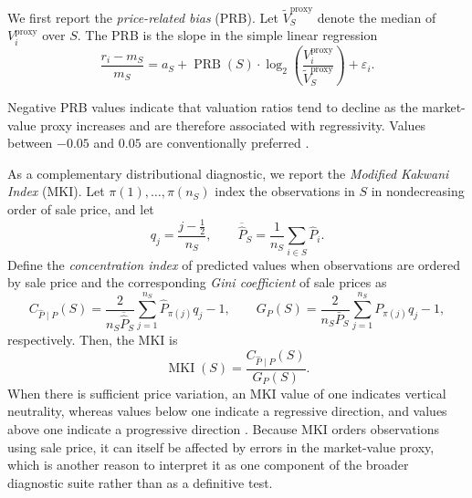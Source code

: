 \documentclass[10pt]{article}
\theoremstyle{definition}
\newcommand{\1}{\mathbf{1}}
\begin{document}
{We first report the \textit{price-related bias} (PRB).}
Let $\widetilde V_S^{\mathrm{proxy}}$ denote the median of $V_i^{\mathrm{proxy}}$ over $S$. The PRB is the slope in the simple linear regression
\begin{equation}
\label{eq:prb}
\frac{r_i-m_S}{m_S}
=
a_S
+
\operatorname{PRB}(S)\cdot
\log_2\left(
\frac{V_i^{\mathrm{proxy}}}
{\widetilde V_S^{\mathrm{proxy}}}
\right)
+
\varepsilon_i.
\end{equation}

Negative PRB values indicate that valuation ratios tend to decline as the market-value proxy increases and are therefore associated with regressivity. Values between $-0.05$ and $0.05$ are conventionally preferred \cite{IAAO2013Ratio}.

{As a complementary distributional diagnostic, we report the \emph{Modified Kakwani Index} (MKI). Let $\pi(1),\allowbreak\ldots,\pi(n_S)$ index the observations in $S$ in nondecreasing order of sale price, and let
\[
q_j=\frac{j-\tfrac12}{n_S},
\qquad
\overline{\widehat P}_S
=
\frac{1}{n_S}\sum_{i\in S}\widehat P_i.
\]
Define the \emph{concentration index} of predicted values when observations are ordered by sale price and the corresponding \emph{Gini coefficient} of sale prices as
\begin{equation}
\label{eq:mki_components}
C_{\widehat P\mid P}(S)
=
\frac{2}{n_S\overline{\widehat P}_S}
\sum_{j=1}^{n_S}
\widehat P_{\pi(j)}q_j
-1,
\qquad 
G_P(S)
=
\frac{2}{n_S\bar P_S}
\sum_{j=1}^{n_S}
P_{\pi(j)}q_j
-1,
\end{equation}
respectively. Then, the MKI is
\begin{equation}
\label{eq:mki}
\operatorname{MKI}(S)
=
\frac{C_{\widehat P\mid P}(S)}{G_P(S)}.
\end{equation}
When there is sufficient price variation, an MKI value of one indicates vertical neutrality, whereas values below one indicate a regressive direction, and values above one indicate a progressive direction \cite{IAAO2026ExposureRatio}. Because MKI orders observations using sale price, it can itself be affected by errors in the market-value proxy, which is another reason to interpret it as one component of the broader diagnostic suite rather than as a definitive test.}



\end{document}
